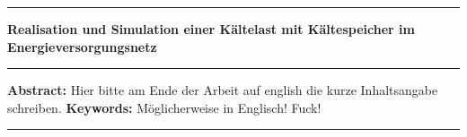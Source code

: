 \cleardoublepage
\begin{vcenterpage}
	\noindent\rule[2pt]{\textwidth}{0.5pt}
	\begin{center}
		{\large\textbf{Realisation und Simulation einer K\"altelast mit K\"altespeicher im Energieversorgungsnetz}}
	\end{center}
	\noindent\rule[2pt]{\textwidth}{0.5pt}
	{\large\textbf{Abstract:}}
	Hier bitte am Ende der Arbeit auf english die kurze Inhaltsangabe schreiben. 
	{\large\textbf{Keywords:}}
	Möglicherweise in Englisch! Fuck!\\
	\noindent\rule[2pt]{\textwidth}{0.5pt}
\end{vcenterpage}

